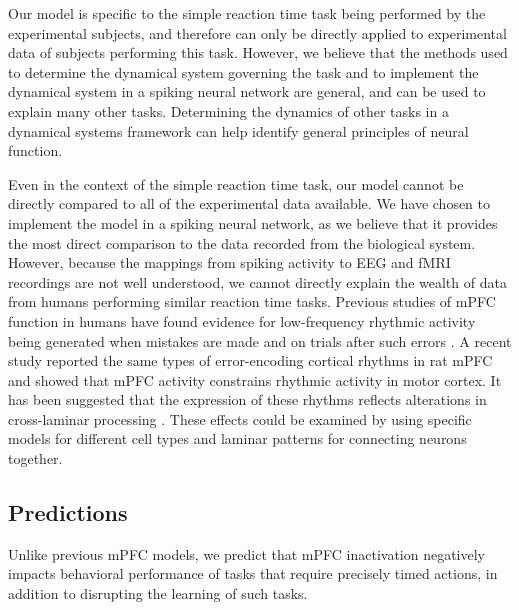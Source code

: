 \documentclass[11pt]{article}
\begin{document}
Our model is specific to the simple reaction time task
being performed by the experimental subjects,
and therefore can only be directly
applied to experimental data
of subjects performing this task.
However, we believe that the
methods used to determine the
dynamical system governing the task
and to implement the dynamical system
in a spiking neural network
are general,
and can be used to explain many other tasks.
Determining the dynamics of other tasks
in a dynamical systems framework
can help identify general principles
of neural function.

Even in the context of the simple reaction time task,
our model cannot be directly compared
to all of the experimental data available.
We have chosen to implement the model
in a spiking neural network,
as we believe that it provides the most
direct comparison to
the data recorded from the biological system.
However, because the mappings from
spiking activity to EEG and fMRI recordings
are not well understood,
we cannot directly explain
the wealth of data from humans performing
similar reaction time tasks.
Previous studies of mPFC function
in humans have found evidence
for low-frequency rhythmic activity being
generated when mistakes are made
and on trials after such errors
\cite{Cavanagh2009}.
A recent study reported the same types
of error-encoding cortical rhythms
in rat mPFC \cite{Narayanan2013}
and showed that mPFC activity constrains
rhythmic activity in motor cortex.
It has been suggested that the expression
of these rhythms reflects alterations
in cross-laminar processing
\cite{Carracedo2013}.
These effects could be examined by
using specific models for different
cell types and laminar patterns
for connecting neurons together.

\subsection{Predictions}

Unlike previous mPFC models,
we predict that mPFC inactivation
negatively impacts behavioral performance
of tasks that require precisely timed actions,
in addition to disrupting
the learning of such tasks.
\end{document}
